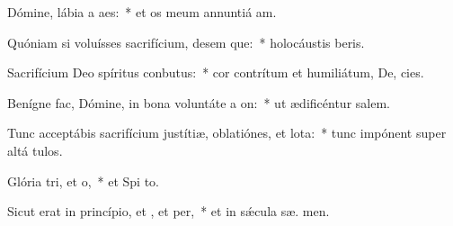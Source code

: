 \item Dómine, lábia a aes:~* et os meum annuntiá  am.
\item Quóniam si voluísses sacrifícium, desem que:~* holocáustis  beris.
\item Sacrifícium Deo spíritus conbutus:~* cor contrítum et humiliátum, De,  cies.
\item Benígne fac, Dómine, in bona voluntáte a on:~* ut ædificéntur  salem.
\item Tunc acceptábis sacrifícium justítiæ, oblatiónes, et lota:~* tunc impónent super altá  tulos.
\item Glória tri, et o,~* et Spi to.
\item Sicut erat in princípio, et , et per,~* et in sǽcula sæ. men.
